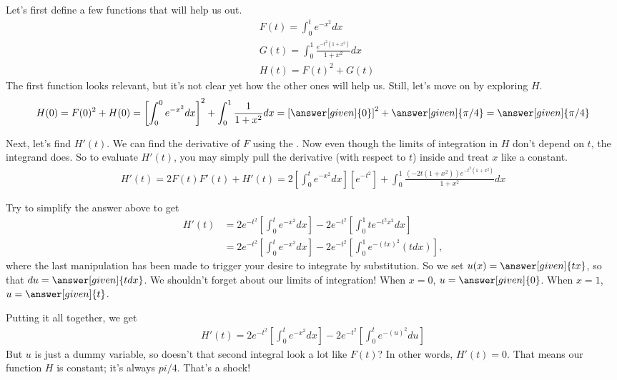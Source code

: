 \documentclass{ximera}
\begin{document}
\begin{exercise}
	Let's first define a few functions that will help us out.
	\begin{align*}
		&F(t)=\int_{0}^{t} e^{-x^2}dx \\
		&G(t)=\int_{0}^{1} \frac{e^{-t^2(1+x^2)}}{1+x^2} dx \\
		&H(t)=F(t)^2+G(t)
	\end{align*}
	The first function looks relevant, but it's not clear yet how the other ones will help us. Still, let's move on by exploring $H$.
	\begin{align*}
	H(0)= F(0)^2+H(0)=\left[\int_{0}^{0} e^{-x^2}dx \right]^2+\int_{0}^{1} \frac{1}{1+x^2} dx = \left[ \answer[given]{0} \right]^2 + \answer[given]{\pi/4} = \answer[given]{\pi/4}
	\end{align*}
	
	Next, let's find $H'(t)$. We can find the derivative of $F$ using the . Now even though the limits of integration in $H$ don't depend on $t$, the integrand does. So to evaluate $H'(t)$, you may simply pull the derivative (with respect to $t$) inside and treat $x$ like a constant.
	\begin{align*}
		H'(t) =2F(t)F'(t)+H'(t) =2 \left[ \int_{0}^{t} e^{-x^2}dx \right] \left[ e^{-t^2} \right]+\int_{0}^{1} \frac{ (-2t(1+x^2)) e^{-t^2(1+x^2)}}{1+x^2} dx
	\end{align*}
	
	\begin{exercise}
		Try to simplify the answer above to get
		\begin{align*}
			H'(t) &= 2e^{-t^2} \left[ \int_{0}^{t} e^{-x^2}dx \right] -2e^{-t^2} \left[ \int_{0}^{1} t e^{-t^2 x^2} dx \right] \\
			&=2e^{-t^2} \left[ \int_{0}^{t} e^{-x^2}dx \right] -2e^{-t^2} \left[ \int_{0}^{1} e^{-(tx)^2} (tdx) \right],
		\end{align*}
		where the last manipulation has been made to trigger your desire to integrate by substitution. So we set $u(x)=\answer[given]{tx}$, so that $du=\answer[given]{tdx}$. We shouldn't forget about our limits of integration! When $x=0$, $u=\answer[given]{0}$. When $x=1$, $u=\answer[given]{t}$.
		
		\begin{exercise}
			Putting it all together, we get
			\begin{align*}
				H'(t)=2e^{-t^2} \left[ \int_{0}^{t} e^{-x^2}dx \right] -2e^{-t^2} \left[ \int_{0}^{t} e^{-(u)^2}du \right]
			\end{align*}
			But $u$ is just a dummy variable, so doesn't that second integral look a lot like $F(t)$? In other words, $H'(t)=0$. That means our function $H$ is constant; it's always $pi/4$. That's a shock!
			

\end{exercise}
\end{exercise}
\end{exercise}
\end{document}
